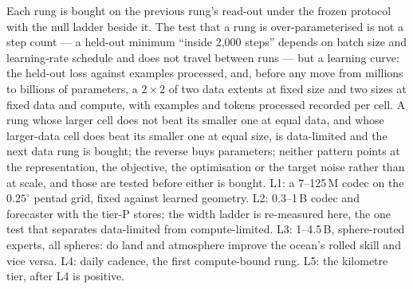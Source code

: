 \documentclass[10pt]{article}
\begin{document}
Each rung is bought on the previous rung's read-out under the frozen
protocol with the null ladder beside it. The test that a rung is
over-parameterised is not a step count --- a held-out minimum ``inside
2{,}000 steps'' depends on batch size and learning-rate schedule and does
not travel between runs --- but a learning curve: the held-out loss against
examples processed, and, before any move from millions to billions of
parameters, a $2\times2$ of two data extents at fixed size and two sizes at
fixed data and compute, with examples and tokens processed recorded per
cell. A rung whose larger cell does not beat its smaller one at equal data,
and whose larger-data cell does beat its smaller one at equal size, is
data-limited and the next data rung is bought; the reverse buys parameters;
neither pattern points at the representation, the objective, the
optimisation or the target noise rather than at scale, and those are tested
before either is bought. L1: a 7--125\,M codec on the $0.25^\circ$ pentad
grid, fixed against learned geometry. L2: 0.3--1\,B codec and forecaster
with the tier-P stores; the width ladder is re-measured here, the one test
that separates data-limited from compute-limited. L3: 1--4.5\,B,
sphere-routed experts, all spheres: do land and atmosphere improve the
ocean's rolled skill and vice versa. L4: daily cadence, the first
compute-bound rung. L5: the kilometre tier, after L4 is positive.
\end{document}
